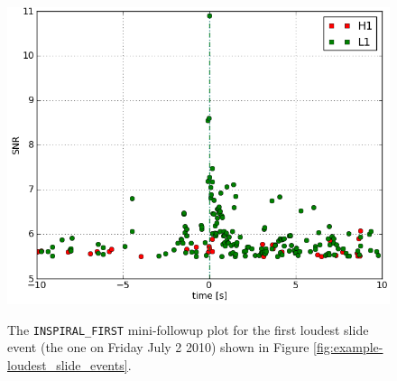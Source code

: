 \begin{figure}[p]
\begin{center}
\label{fig:sample-minifup_slide}
\includegraphics[width=4.8in]{figures/slide-loudest_events/H1L1-FULL_DATA_CAT_3_VETO_FULL_DATA_map-INSPIRAL_FIRST-3_LOUDEST_SLIDE_EVENTS_BY_COMBINED_FAR_SUMMARY-961545543-3628944.png}
\end{center}
\caption{The \texttt{INSPIRAL\_FIRST} mini-followup plot for the first loudest slide event (the one on Friday July 2 2010) shown in Figure \ref{fig:example-loudest_slide_events}.}
\end{figure}

